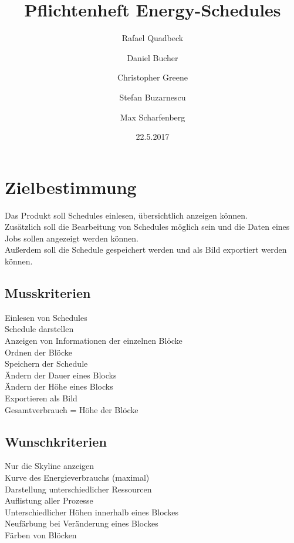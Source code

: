 \documentclass[parskip=full]{scrartcl}
\title{Pflichtenheft Energy-Schedules}
\date{22.5.2017}
\author{
	Rafael Quadbeck\\
	\and
	Daniel Bucher\\
	\and
	Christopher Greene\\
	\and
	Stefan Buzarnescu\\
	\and
	Max Scharfenberg\\
}
\begin{document}
	
	\maketitle
	
	\newpage
	
	\tableofcontents
	
	\listoffigures
	
	\listoftables
	
	\newpage
	
	
	\section{Zielbestimmung}
		Das Produkt soll Schedules einlesen, übersichtlich anzeigen können.\\ Zusätzlich soll die Bearbeitung von Schedules möglich sein und die Daten eines Jobs sollen angezeigt werden können.\\ Außerdem soll die Schedule gespeichert werden und als Bild exportiert werden können.\\
		\subsection{Musskriterien}
			Einlesen von Schedules\\
			Schedule darstellen\\
			Anzeigen von Informationen der einzelnen Blöcke\\
			Ordnen der Blöcke\\
			Speichern der Schedule\\
			Ändern der Dauer eines Blocks\\
			Ändern der Höhe eines Blocks\\
			Exportieren als Bild\\
			Gesamtverbrauch = Höhe der Blöcke\\
		\subsection{Wunschkriterien}
			Nur die Skyline anzeigen\\
			Kurve des Energieverbrauchs (maximal)\\
			Darstellung unterschiedlicher Ressourcen\\
			Auflistung aller Prozesse\\
			Unterschiedlicher Höhen innerhalb eines Blockes\\
			Neufärbung bei Veränderung eines Blockes\\
			Färben von Blöcken\\
\end{document}
